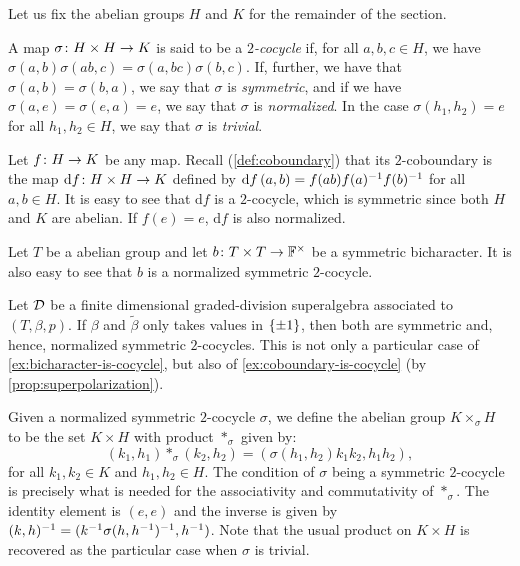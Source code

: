 Let us fix the abelian groups $H$ and $K$ for the remainder of the section.

\begin{defi}\label{defi:cocycle}
	A map $\sigma\colon H\times H \to K$ is said to be a \emph{$2$-cocycle} if, for all $a,b,c \in H$, we have $\sigma(a,b) \sigma(ab, c) = \sigma(a, bc) \sigma(b,c)$.
	If, further, we have that $\sigma(a,b) = \sigma(b,a)$, we say that $\sigma$ is \emph{symmetric}, and if we have $\sigma(a, e) = \sigma(e, a) = e$, we say that $\sigma$ is \emph{normalized}.
	In the case $\sigma(h_1, h_2) = e$ for all $h_1, h_2 \in H$, we say that $\sigma$ is \emph{trivial}.
\end{defi}


\begin{ex}\label{ex:coboundary-is-cocycle}
	Let $f\colon H \to K$ be any map. 
	Recall (\cref{def:coboundary}) that its $2$-coboundary is the map $\mathrm{d} f\colon H\times H \to K$ defined by $\mathrm{d} f\, (a,b) = f(ab)f(a)^{-1} f(b)^{-1}$ for all $a,b \in H$. 
	It is easy to see that $\mathrm{d} f$ is a $2$-cocycle, which is symmetric since both $H$ and $K$ are abelian. 
	If $f(e) = e$, $\mathrm{d} f$ is also normalized. 
\end{ex}

\begin{ex}\label{ex:bicharacter-is-cocycle}
    Let $T$ be a abelian group and let $b\colon T\times T \to \mathbb{F}^\times$ be a symmetric bicharacter. 
    It is also easy to see that $b$ is a normalized symmetric $2$-cocycle. 
\end{ex}

\begin{ex}\label{ex:beta-is-cocycle}
    Let $\mathcal{D}$ be a finite dimensional graded-division superalgebra associated to $(T, \beta, p)$. 
    If $\beta$ and $\tilde\beta$ only takes values in $\{ \pm 1 \}$, then both are symmetric and, hence, normalized symmetric $2$-cocycles. 
    This is not only a particular case of \cref{ex:bicharacter-is-cocycle}, but also of \cref{ex:coboundary-is-cocycle} (by \cref{prop:superpolarization}). 
\end{ex}


Given a normalized symmetric $2$-cocycle $\sigma$, we define the abelian group $K \times_\sigma H$ to be the set $K\times H$ with product $*_\sigma$ given by:
\[
	(k_1, h_1)*_\sigma(k_2, h_2) = (\sigma(h_1, h_2) k_1 k_2, h_1 h_2),
\]
for all $k_1, k_2 \in K$ and $h_1, h_2 \in H$.
The condition of $\sigma$ being a symmetric $2$-cocycle is precisely what is needed for the associativity and commutativity of $*_\sigma$.
The identity element is $(e, e)$ and the inverse is given by $(k, h)^{-1} = (k^{-1} \sigma(h,h^{-1})^{-1}, h^{-1})$.
Note that the usual product on $K\times H$ is recovered as the particular case when $\sigma$ is trivial.

